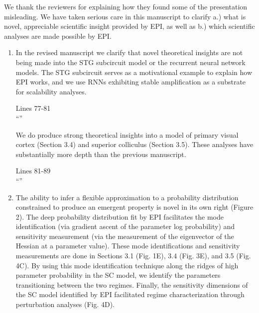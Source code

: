 \documentclass[11pt,a4paper]{article}
\begin{document}
We thank the reviewers for explaining how they found some of the
presentation misleading.  We have taken serious care in this manuscript to clarify a.)
what is novel, appreciable scientific insight provided by EPI, as well as b.) which scientific
analyses are made possible by EPI.

\begin{enumerate}[label=(\alph*)]
\item  In the revised manuscript we clarify that novel theoretical insights are not being made into the STG subcircuit model or the recurrent neural network models.  The STG subcircuit serves as a motivational example to explain how EPI works, and we use RNNs exhibiting stable amplification as a substrate for scalability analyses.  

\begin{displayquote}
Lines 77-81 \\
``''
\end{displayquote}

We do produce strong theoretical insights into a model of primary visual cortex (Section 3.4) and superior colliculus (Section 3.5).  These analyses have substantially more depth than the previous manuscript.

\begin{displayquote}
Lines 81-89 \\
``''
\end{displayquote}

\item The ability to infer a flexible approximation to a probability distribution constrained to produce an emergent property is novel in its own right (Figure 2).  The deep probability distribution fit by EPI facilitates the mode identification (via gradient ascent of the parameter log probability) and sensitivity measurement (via the measurement of the eigenvector of the Hessian at a parameter value). These mode identifications and sensitivity measurements are done in Sections 3.1 (Fig. 1E), 3.4 (Fig. 3E), and 3.5 (Fig. 4C).  By using this mode identification technique along the ridges of high parameter probability in the SC model, we identify the parameters transitioning between the two regimes.  Finally, the sensitivity dimensions of the SC model identified by EPI facilitated regime characterization through perturbation analyses (Fig. 4D).
 
\end{enumerate}
\end{document}
